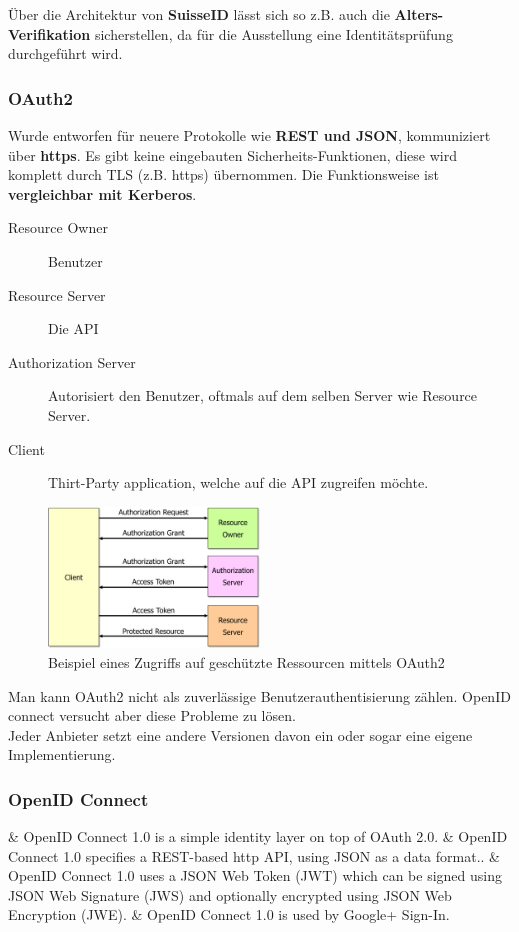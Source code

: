 Über die Architektur von \textbf{SuisseID} lässt sich so z.B. auch die \textbf{Alters-Verifikation} sicherstellen, da für die Ausstellung eine Identitätsprüfung durchgeführt wird.

\subsubsection{OAuth2}
Wurde entworfen für neuere Protokolle wie \textbf{REST und JSON}, kommuniziert über \textbf{https}. Es gibt keine eingebauten Sicherheits-Funktionen, diese wird komplett durch TLS (z.B. https) übernommen. Die Funktionsweise ist \textbf{vergleichbar mit Kerberos}.\\

\begin{description}
	\item[Resource Owner] Benutzer
	\item[Resource Server] Die API
	\item[Authorization Server] Autorisiert den Benutzer, oftmals auf dem selben Server wie Resource Server.
	\item[Client] Thirt-Party application, welche auf die API zugreifen möchte.
\end{description}


\begin{figure}[H]
	\centering
	\includegraphics[width=0.5\textwidth]{./img/oauth2-example}
	\caption{Beispiel eines Zugriffs auf geschützte Ressourcen mittels OAuth2}
\end{figure}

Man kann OAuth2 nicht als zuverlässige Benutzerauthentisierung zählen. OpenID connect versucht aber diese Probleme zu lösen.\\

Jeder Anbieter setzt eine andere Versionen davon ein oder sogar eine eigene Implementierung.

\subsubsection{OpenID Connect}
\begin{easylist}[itemize]
	& OpenID Connect 1.0 is a simple identity layer on top of OAuth 2.0.
	& OpenID Connect 1.0 specifies a REST-based http API, using JSON as a data format..
	& OpenID Connect 1.0 uses a JSON Web Token (JWT) which can be signed using JSON Web Signature (JWS) and optionally encrypted using JSON Web Encryption (JWE).
	& OpenID Connect 1.0 is used by Google+ Sign-In.
\end{easylist}